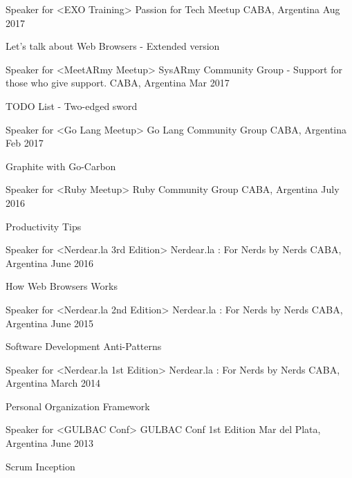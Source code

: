 
\begin{cventries}
  \cventry
    {Speaker for <EXO Training>}
    {Passion for Tech Meetup }
    {CABA, Argentina}
    {Aug 2017}
    {
      \begin{cvitems}
        \item {Let's talk about Web Browsers - Extended version}
      \end{cvitems}
    }

  \cventry
    {Speaker for <MeetARmy Meetup>}
    {SysARmy Community Group - Support for those who give support. }
    {CABA, Argentina}
    {Mar 2017}
    {
      \begin{cvitems}
        \item {TODO List - Two-edged sword}
      \end{cvitems}
    }

  \cventry
    {Speaker for <Go Lang Meetup>}
    {Go Lang Community Group }
    {CABA, Argentina}
    {Feb 2017}
    {
      \begin{cvitems}
        \item {Graphite with Go-Carbon}
      \end{cvitems}
    }

  \cventry
    {Speaker for <Ruby Meetup>}
    {Ruby Community Group}
    {CABA, Argentina}
    {July 2016}
    {
      \begin{cvitems}
        \item {Productivity Tips}
      \end{cvitems}
    }

  \cventry
    {Speaker for <Nerdear.la 3rd Edition>}
    {Nerdear.la : For Nerds by Nerds}
    {CABA, Argentina}
    {June 2016}
    {
      \begin{cvitems}
        \item {How Web Browsers Works}
      \end{cvitems}
    }

  \cventry
    {Speaker for <Nerdear.la 2nd Edition>}
    {Nerdear.la : For Nerds by Nerds}
    {CABA, Argentina}
    {June 2015}
    {
      \begin{cvitems}
        \item {Software Development Anti-Patterns}
      \end{cvitems}
    }

  \cventry
    {Speaker for <Nerdear.la 1st Edition>}
    {Nerdear.la : For Nerds by Nerds}
    {CABA, Argentina}
    {March 2014}
    {
      \begin{cvitems}
        \item {Personal Organization Framework}
      \end{cvitems}
    }

  \cventry
    {Speaker for <GULBAC Conf>}
    {GULBAC Conf 1st Edition}
    {Mar del Plata, Argentina}
    {June 2013}
    {
      \begin{cvitems}
        \item {Scrum Inception}
      \end{cvitems}
    }
\end{cventries}
